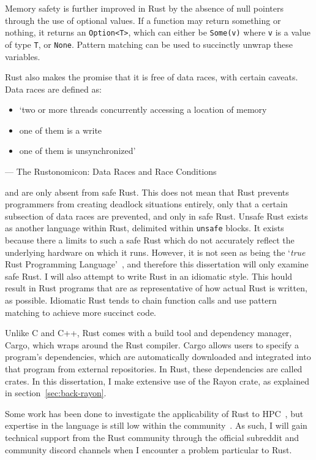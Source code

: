 Memory safety is further improved in Rust by the absence of null pointers through the use of optional values. If a function may return something or nothing, it returns an \texttt{Option<T>}, which can either be \texttt{Some(v)} where \texttt{v} is a value of type \texttt{T}, or \texttt{None}. Pattern matching can be used to succinctly unwrap these variables.

Rust also makes the promise that it is free of data races, with certain caveats. Data races are defined as:
\begin{itemize}
    \item `two or more threads concurrently accessing a location of memory
    \item one of them is a write
    \item one of them is unsynchronized'
\end{itemize}
\begin{flushright}
--- The Rustonomicon: Data Races and Race Conditions~\cite{NomRace}
\end{flushright}

and are only absent from safe Rust. This does not mean that Rust prevents programmers from creating deadlock situations entirely, only that a certain subsection of data races are prevented, and only in safe Rust. Unsafe Rust exists as another language within Rust, delimited within \texttt{unsafe} blocks. It exists because there a limits to such a safe Rust which do not accurately reflect the underlying hardware on which it runs. However, it is not seen as being the `\textit{true} Rust Programming Language'~\cite{NomSafe}, and therefore this dissertation will only examine safe Rust. I will also attempt to write Rust in an idiomatic style. This hould result in Rust programs that are as representative of how actual Rust is written, as possible. Idiomatic Rust tends to chain function calls and use pattern matching to achieve more succinct code.

Unlike C and C++, Rust comes with a build tool and dependency manager, Cargo, which wraps around the Rust compiler. Cargo allows users to specify a program's dependencies, which are automatically downloaded and integrated into that program from external repositories. In Rust, these dependencies are called crates. In this dissertation, I make extensive use of the Rayon crate, as explained in section~\ref{sec:back-rayon}.

Some work has been done to investigate the applicability of Rust to HPC~, but expertise in the language is still low within the community~. As such, I will gain technical support from the Rust community through the official subreddit and community discord channels when I encounter a problem particular to Rust.

